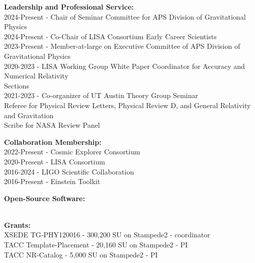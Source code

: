 \documentclass[11pt]{article}
\begin{document}
\begin{flushleft}
  \vspace{8px}

  \textbf{Leadership and Professional Service: }\\
  2024-Present - Chair of Seminar Committee for APS Division of Gravitational Physics\\
  2024-Present - Co-Chair of LISA Consortium Early Career Scientists\\
  2023-Present - Member-at-large on Executive Committee of APS Division of Gravitational Physics\\
  2020-2023 - LISA Working Group White Paper Coordinator for Accuracy and Numerical Relativity\\ \hspace{58px}Sections \\
  2021-2023 - Co-organizer of UT Austin Theory Group Seminar\\
  Referee for Physical Review Letters, Physical Review D,  and General Relativity and Gravitation\\
  Scribe for NASA Review Panel\\
  
  \vspace{8px}  
  
  \textbf{Collaboration Membership: }\\
  2022-Present - Cosmic Explorer Consortium\\
  2020-Present - LISA Consortium\\
  2016-2024 - LIGO Scientific Collaboration\\
  2016-Present - Einstein Toolkit\\
  
  \vspace{8px}
  
  \textbf{Open-Source Software:}\\
  \\
  
  \vspace{8px}

  \textbf{Grants:}\\
	XSEDE TG-PHY120016 - 300,200 SU on Stampede2 - coordinator\\
	TACC Template-Placement - 20,160 SU on Stampede2 - PI\\
	TACC NR-Catalog - 5,000 SU on Stampede2 - PI\\
	

\end{flushleft}
\end{document}
